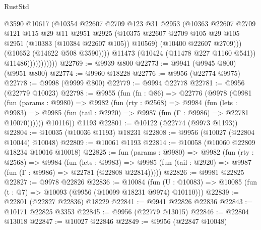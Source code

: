 \begin{lexlean}{RustStd}
\begin{coremodule}
                              @3590
                              @10617
                              (@10354
                                @22607
                                @2709
                                @123
                                @31
                                @2953
                                (@10363
                                  @22607
                                  @2709
                                  @121
                                  @115
                                  @29
                                  @11
                                  @2951
                                  @2925
                                  (@10375
                                    @22607
                                    @2709
                                    @105
                                    @29
                                    @105
                                    @2951
                                    (@10383 (@10384 @22607 @105))
                                    @10569)
                                  (@10400 @22607 @2709)))
                              (@10652 (@14622 @508 @3590))))
                          @11473
                          (@10424 (@11478 @227 @1160 @541))
                          @11486)))))))))))
@22769 := @9939 @800
@22773 := @9941 (@9945 @800) (@9951 @800)
@22774 := @9960 @18228
@22776 := @9956 (@22774 @9975)
@22778 := @9998 (@9999 @800)
@22779 := @9994 @22778
@22781 := @9956 (@22779 @10023)
@22798 := @9955
    (fun (fn : @86) =>
    @22776
      (@9978
        (@9981
          (fun (params : @9980) =>
          @9982
            (fun (rty : @2568) =>
            @9984
              (fun (lets : @9983) =>
              @9985 (fun (tail : @2920) => @9987 (fun (Γ : @9986) => @22781 @10070))))))
        @10116))
    @1193
@22801 := @10122 (@22774 (@9973 @1193))
@22804 := @10035 (@10036 @1193) @18231
@22808 := @9956 (@10027 (@22804 @10044) @10048)
@22809 := @10061 @1193
@22814 := @10058 (@10060 @22809 @18234 @10016 @10018)
@22825 := fun (params : @9980) =>
  @9982
    (fun (rty : @2568) =>
    @9984
      (fun (lets : @9983) =>
      @9985 (fun (tail : @2920) => @9987 (fun (Γ : @9986) => @22781 (@22808 @22814)))))
@22826 := @9981 @22825
@22827 := @9978 @22826
@22836 := @10084
    (fun (U : @10083) => @10085 (fun (t : @7) => @10093 (@9956 (@10099 @18231 @9974) @10110)))
@22839 := @22801 (@22827 @22836) @18229
@22841 := @9941 @22826 @22836
@22843 := @10171 @22825 @3353
@22845 := @9956 (@22779 @13015)
@22846 := @22804 @13018
@22847 := @10027 @22846
@22849 := @9956 (@22847 @10048)

\end{coremodule}
\end{lexlean}
